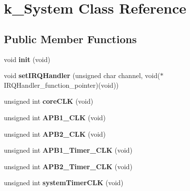 \hypertarget{classk__System}{}\section{k\+\_\+\+System Class Reference}
\label{classk__System}
\subsection*{Public Member Functions}
\begin{DoxyCompactItemize}
\item 
void {\bfseries init} (void)\hypertarget{classk__System_a64d29c16b11b39f8032048557686b55b}{}\label{classk__System_a64d29c16b11b39f8032048557686b55b}

\item 
void {\bfseries set\+I\+R\+Q\+Handler} (unsigned char channel, void($\ast$I\+R\+Q\+Handler\+\_\+function\+\_\+pointer)(void))\hypertarget{classk__System_acbbcbe77d02d1f0f44018ea592d66063}{}\label{classk__System_acbbcbe77d02d1f0f44018ea592d66063}

\item 
unsigned int {\bfseries core\+C\+LK} (void)\hypertarget{classk__System_a8498334c58d72301eca284a6731e1af7}{}\label{classk__System_a8498334c58d72301eca284a6731e1af7}

\item 
unsigned int {\bfseries A\+P\+B1\+\_\+\+C\+LK} (void)\hypertarget{classk__System_a6ab24be5208f39828ba0facb5abd7377}{}\label{classk__System_a6ab24be5208f39828ba0facb5abd7377}

\item 
unsigned int {\bfseries A\+P\+B2\+\_\+\+C\+LK} (void)\hypertarget{classk__System_a8d83e8d0e96f6eb2d8a69812932cb189}{}\label{classk__System_a8d83e8d0e96f6eb2d8a69812932cb189}

\item 
unsigned int {\bfseries A\+P\+B1\+\_\+\+Timer\+\_\+\+C\+LK} (void)\hypertarget{classk__System_a74bde4f64d6f26ed2c371bfd6fc5c33c}{}\label{classk__System_a74bde4f64d6f26ed2c371bfd6fc5c33c}

\item 
unsigned int {\bfseries A\+P\+B2\+\_\+\+Timer\+\_\+\+C\+LK} (void)\hypertarget{classk__System_ae88a6f214685f821d5a8d56bb56a004a}{}\label{classk__System_ae88a6f214685f821d5a8d56bb56a004a}

\item 
unsigned int {\bfseries system\+Timer\+C\+LK} (void)\hypertarget{classk__System_ab1c80ab5a9bc23413f2ffafae9194776}{}\label{classk__System_ab1c80ab5a9bc23413f2ffafae9194776}


\end{DoxyCompactItemize}

